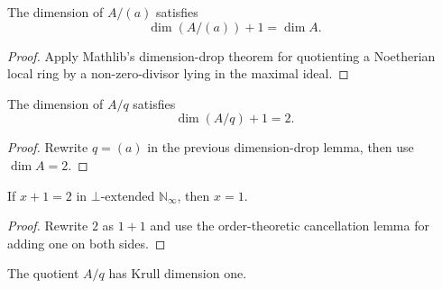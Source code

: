 \begin{lemma}
  \label{lem:bad_quotient_source_data_quotient_span_generator_dimension_add_one}
  The dimension of \(A/(a)\) satisfies
  \[
    \dim(A/(a))+1=\dim A.
  \]
\end{lemma}

\begin{proof}
  Apply Mathlib's dimension-drop theorem for quotienting a Noetherian local
  ring by a non-zero-divisor lying in the maximal ideal.
\end{proof}

\begin{lemma}
  \label{lem:bad_quotient_source_data_quotient_dimension_add_one_eq_two_source}
  The dimension of \(A/q\) satisfies
  \[
    \dim(A/q)+1=2.
  \]
\end{lemma}

\begin{proof}
  Rewrite \(q=(a)\) in the previous dimension-drop lemma, then use
  \(\dim A=2\).
\end{proof}

\begin{lemma}
  \label{lem:with_bot_enat_eq_one_of_add_one_eq_two}
  If \(x+1=2\) in \(\bot\)-extended \(\mathbb N_\infty\), then \(x=1\).
\end{lemma}

\begin{proof}
  Rewrite \(2\) as \(1+1\) and use the order-theoretic cancellation lemma for
  adding one on both sides.
\end{proof}

\begin{lemma}
  \label{lem:bad_quotient_source_data_quotient_ring_krull_dim_eq_one_source}
  The quotient \(A/q\) has Krull dimension one.
\end{lemma}

